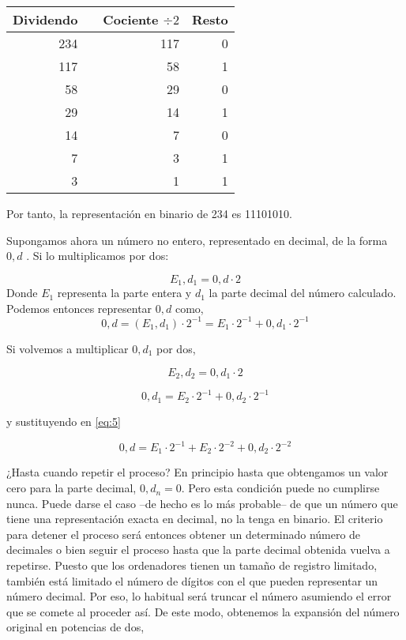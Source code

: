 \begin{table}[h]
\begin{tabular}{|r|r|r|r|}
Dividendo& &Cociente $\div 2$&Resto\\
\hline
234& &117&0\\
117& &58&1\\
58& &29&0\\
29& &14&1\\
14& &7&0\\
7& &3&1\\
3& &1&1
\end{tabular}
\end{table}
 
 Por tanto, la representación en binario de 234 es 11101010.
 
Supongamos ahora un número no entero, representado en decimal, de la forma $0,d$ . Si lo multiplicamos por dos:

\begin{equation}
E_1,d_1=0,d\cdot 2
\end{equation}
Donde $E_1$ representa la parte entera y $d_1$ la parte decimal del número calculado.
Podemos entonces representar $0,d$ como,
\begin{equation}
\label{eq:5}
0,d=(E_1,d_1)\cdot 2^{-1}=E_1\cdot 2^{-1}+0,d_1\cdot 2^{-1}
\end{equation}  

Si volvemos a multiplicar $0,d_1$ por dos,

\begin{equation}
E_2,d_2 = 0,d_1\cdot 2
\end{equation}

\begin{equation}
0,d_1=E_2\cdot 2^{-1}+0,d_2\cdot 2^{-1}
\end{equation}  

y sustituyendo en \ref{eq:5}

\begin{equation}
0,d=E_1\cdot 2^{-1}+E_2\cdot 2^{-2}+0,d_2\cdot 2^{-2}
\end{equation}

¿Hasta cuando repetir el proceso? En principio hasta que obtengamos un valor cero para la parte decimal, $0,d_n=0$. Pero esta condición puede no cumplirse nunca. Puede darse el caso --de hecho es lo más probable-- de que un número que tiene una representación exacta en decimal, no la tenga en binario. El criterio para detener el proceso será entonces obtener un determinado número de decimales o bien seguir el proceso hasta que la parte decimal obtenida vuelva a repetirse. Puesto que los ordenadores tienen un tamaño de registro limitado, también está limitado el número de dígitos con el que pueden representar un número decimal. Por eso, lo habitual será truncar el número asumiendo el error que se comete al proceder así.  De este modo, obtenemos la expansión del número original en potencias de dos,

